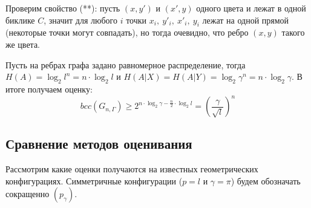 \documentclass[a4paper]{article}
\begin{document}
\begin{itemize}[noitemsep]
     Проверим свойство (**): пусть $(x, y')$ и $(x', y)$ одного цвета и лежат в одной биклике $C$, значит 
     для любого $i$ точки $x_i,\ y'_i,\ x'_i,\ y_i$ лежат на одной прямой (некоторые точки могут совпадать), 
     но тогда очевидно, что ребро $(x, y)$ такого же цвета. 
     
     Пусть на ребрах графа задано равномерное распределение, тогда $H(A) = \log_2l^n = n\cdot\log_2l$ и 
     $H(A|X)=H(A|Y) = \log_2\gamma^n = n\cdot\log_2\gamma$. В итоге получаем оценку: $$bcc(G_{n, \Gamma}) \geq 
     2^{n\cdot\log_2\gamma - \frac{n}{2}\cdot\log_2l} = \left(\frac{\gamma}{\sqrt{l}}\right)^n$$
     
\end{itemize}

\subsection{Сравнение методов оценивания}

Рассмотрим какие оценки получаются на известных геометрических конфигурациях. Симметричные конфигурации ($p = l$ и 
$\gamma = \pi$) будем обозначать сокращенно $(p_{\gamma})$.
\end{document}
